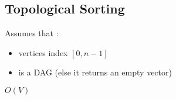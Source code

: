 \subsection{Topological Sorting}

Assumes that :
\begin{itemize}
  \item vertices index $[0, n-1]$
  \item is a DAG (else it returns an empty vector)
\end{itemize}

$O(V)$
